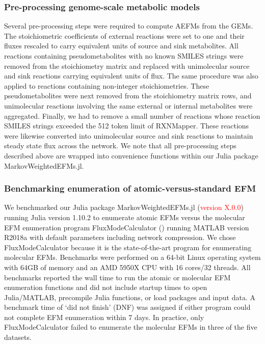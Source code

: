 \documentclass[12pt]{article}
\begin{document}
\subsubsection*{Pre-processing genome-scale metabolic models}

Several pre-processing steps were required to compute AEFMs from the GEMs.
The stoichiometric coefficients of external reactions were set to one and
their fluxes rescaled to carry equivalent units of source and sink
metabolites. All reactions containing pseudometabolites with no known
SMILES strings were removed from the stoichiometry matrix and replaced
with unimolecular source and sink reactions carrying equivalent units of
flux. The same procedure was also applied to reactions containing
non-integer stoichiometries. These pseudometabolites were next removed
from the stoichiometry matrix rows, and unimolecular reactions involving
the same external or internal metabolites were aggregated. Finally, we had
to remove a small number of reactions whose reaction SMILES strings
exceeded the 512 token limit of RXNMapper. These reactions were likewise
converted into unimolecular source and sink reactions to maintain steady
state flux across the network. We note that all pre-processing steps
described above are wrapped into convenience functions within our Julia
package MarkovWeightedEFMs.jl.

\subsubsection*{Benchmarking enumeration of atomic-versus-standard EFM}

We benchmarked our Julia package MarkovWeightedEFMs.jl
(\textcolor{red}{version X.0.0}) running Julia version 1.10.2 to enumerate
atomic EFMs versus the molecular EFM enumeration program
FluxModeCalculator (\cite{vanKlinkenJanBert2016Faet}) running MATLAB
version R2018a with default parameters including network compression. We
chose FluxModeCalculator because it is the state-of-the-art program for
enumerating molecular EFMs. Benchmarks were performed on a 64-bit Linux
operating system with 64GB of memory and an AMD 5950X CPU with 16 cores/32
threads. All benchmarks reported the wall time to run the atomic or
molecular EFM enumeration functions and did not include startup times to
open Julia/MATLAB, precompile Julia functions, or load packages and input
data. A benchmark time of `did not finish' (DNF) was assigned if either
program could not complete EFM enumeration within 7 days. In practice,
only FluxModeCalculator failed to enumerate the molecular EFMs in three of
the five datasets.
\end{document}
